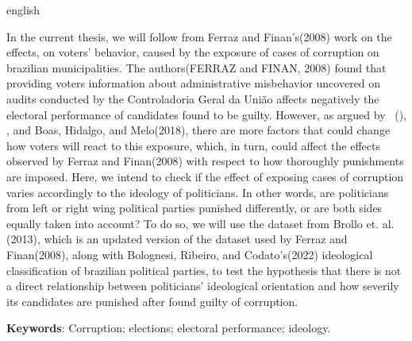 \documentclass[
	12pt,				%
	openright,			%
	twoside,			%
	a4paper,			%
	openany,
	english,			%
	brazil				%
	]{abntex2}
\newcommand{\listofquadrosname}{Lista de quadros}
\begin{document}
\begin{resumo}[Abstract]
	
	\begin{otherlanguage*}{english}
		
In the current thesis, we will follow from Ferraz and Finan's(2008) work on the effects, on voters' behavior, caused by the exposure of cases of corruption on brazilian municipalities. The authors(FERRAZ and FINAN, 2008) found that providing voters information about administrative misbehavior uncovered on audits conducted by the Controladoria Geral da União affects negatively the electoral performance of candidates found to be guilty. However, as argued by ~(\citeyear{Botero2021Apr}), \cite{dunning2019voter}, and Boas, Hidalgo, and Melo(2018), there are more factors that could change how voters will react to this exposure, which, in turn, could affect the effects observed by Ferraz and Finan(2008) with respect to how thoroughly punishments are imposed.
Here, we intend to check if the effect of exposing cases of corruption varies accordingly to the ideology of politicians. In other words, are politicians from left or right wing political parties punished differently, or are both sides equally taken into account? To do so, we will use the dataset from Brollo et. al.(2013), which is an updated version of the dataset used by Ferraz and Finan(2008), along with Bolognesi, Ribeiro, and Codato's(2022) ideological classification of brazilian political parties, to test the hypothesis that there is not a direct relationship between politicians' ideological orientation and how severily its candidates are punished after found guilty of corruption.
	
\textbf{Keywords}: Corruption; elections; electoral performance; ideology.
   
	\end{otherlanguage*}

\end{resumo}

\cleardoublepage

\pdfbookmark[0]{\listofquadrosname}{loq}
\cleardoublepage

\cleardoublepage


\end{document}
